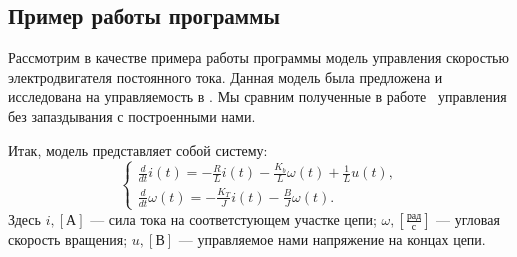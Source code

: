 \subsection{Пример работы программы}
\label{sec:continuous-example}

Рассмотрим в качестве примера работы программы модель управления скоростью электродвигателя постоянного тока. Данная модель была предложена и исследована на управляемость в \cite{baghdad}. Мы сравним полученные в работе~\cite{baghdad} управления без запаздывания с построенными нами.

Итак, модель представляет собой систему:
\begin{equation}\label{eq:example}
\begin{cases}
\frac{d}{dt}i(t)
=
-\frac{R}{L}i(t)
-
\frac{K_b}{L}\omega(t)
+
\frac{1}{L}u(t),\\
\frac{d}{dt}\omega(t)
=
-\frac{K_T}{J}i(t)
-
\frac{B}{J}\omega(t).
\end{cases}
\end{equation}
Здесь $i,[\mbox{А}]$ --- сила тока на соответстующем участке цепи; $\omega,\left[\frac{\mbox{рад}}{\mbox{с}}\right]$ --- угловая скорость вращения; $u,[\mbox{В}]$ --- управляемое нами напряжение на концах цепи. 

